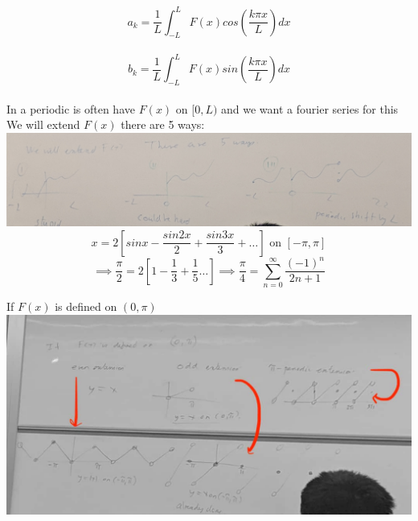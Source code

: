 \documentclass[11pt]{article}
\theoremstyle{definition}
\begin{document}
$$a_k = \frac{1}{L}\int^L_{-L}F(x)cos(\frac{k \pi x}{L})dx$$\\
$$b_k = \frac{1}{L}\int^L_{-L}F(x)sin(\frac{k \pi x}{L})dx$$\\

In a periodic is often have $F(x)$ on $[0,L)$ and we want a fourier series for this\\

We will extend $F(x)$ there are 5 ways:\\
\includegraphics[width=\textwidth]{MVIMG_20181109_102732.jpg}\\

$$x = 2[sinx -\frac{sin2x}{2} + \frac{sin3x}{3} + \dots] \text{ on } [-\pi, \pi]$$
$$\implies \frac{\pi}{2} = 2[1 - \frac{1}{3} + \frac{1}{5} \dots]\implies \frac{\pi}{4} = \sum^\infty_{n=0} \frac{(-1)^n}{2n + 1}$$

If $F(x)$ is defined on $(0,\pi)$\\
\includegraphics[width=\textwidth]{extensions.jpg}\\
\end{document}
